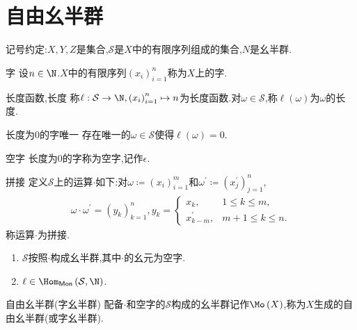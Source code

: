 \section{自由幺半群}

记号约定:$X,Y,Z$是集合,$\mathcal{S}$是$X$中的有限序列组成的集合,$N$是幺半群.

\begin{definition}{字}{}
	设$n\in\N$.$X$中的有限序列$\left(x_{i}\right)_{i=1}^{n}$称为$X$上的字.
\end{definition}

\begin{definition}{长度函数,长度}{}
	称$\ell:\mathcal{S}\to\N,\left(x_{i}\right)_{i=1}^{n}\mapsto n$为长度函数.对$\omega\in\mathcal{S}$,称$\ell\left(\omega\right)$为$\omega$的长度.
\end{definition}

\begin{proposition}{长度为$0$的字唯一}{}
	存在唯一的$\omega\in\mathcal{S}$使得$\ell\left(\omega\right)=0$.
\end{proposition}

\begin{definition}{空字}{}
	长度为$0$的字称为空字,记作$\epsilon$.
\end{definition}

\begin{definition}{拼接}{}
	定义$\mathcal{S}$上的运算$\cdot$如下:对$\omega\coloneq\left(x_{i}\right)_{i=1}^{m}$和$\omega^{\prime}\coloneq\left(x_{j}^{\prime}\right)_{j=1}^{n}$,
	\begin{align*}
		\omega\cdot\omega^{\prime}=\left(y_{k}\right)_{k=1}^{n},y_{k}=
		\begin{cases}
			x_{k},&1\leq k\leq m,\\
			x_{k-m}^{\prime},&m+1\leq k\leq n.
		\end{cases}
	\end{align*}
	称运算$\cdot$为拼接.
\end{definition}

\begin{proposition}{}{}
	\begin{enumerate}
		\item $\mathcal{S}$按照$\cdot$构成幺半群,其中$\cdot$的幺元为空字.
		\item $\ell\in\Hom_{\mathsf{Mon}}\left(\mathcal{S},\N\right)$.
	\end{enumerate}
\end{proposition}

\begin{definition}{自由幺半群(字幺半群)}{}
	配备$\cdot$和空字的$\mathcal{S}$构成的幺半群记作$\Mo\left(X\right)$,称为$X$生成的自由幺半群(或字幺半群).
\end{definition}


